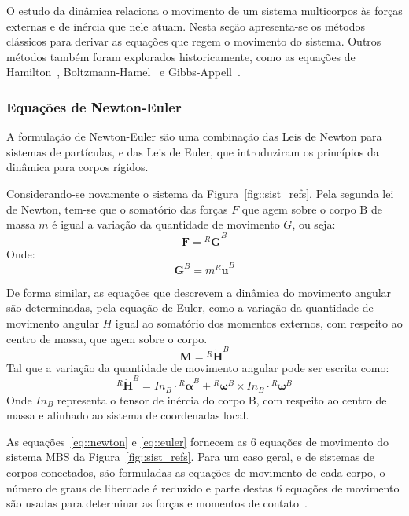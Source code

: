 O estudo da dinâmica relaciona o movimento de um sistema multicorpos às forças
externas e de inércia que nele atuam. Nesta seção apresenta-se os métodos
clássicos para derivar as equações que regem o movimento do sistema. Outros
métodos também foram explorados historicamente, como as equações de
Hamilton~\cite{shabana2013dynamics},
Boltzmann-Hamel~\cite{papastavridis1994boltzmann} e
Gibbs-Appell~\cite{gibbsappell}.
 
\subsubsection{Equações de Newton-Euler}

A formulação de Newton-Euler são uma combinação das Leis de Newton para sistemas
de partículas, e das Leis de Euler, que introduziram os princípios da dinâmica
para corpos rígidos. 

Considerando-se novamente o sistema da Figura~\ref{fig::sist_refs}. Pela segunda
lei de Newton, tem-se que o somatório das forças $F$ que agem sobre o corpo B de
massa $m$ é igual a variação da quantidade de movimento $G$, ou seja:
%
\begin{equation} \label{eq::newton}
	\mathbf{F} = {^R}{\dot{\mathbf{G}}}^{B}
\end{equation}
%
Onde:
%
\begin{equation}
	\mathbf{G}^{B} = m {^R}\dot{\textbf{u}}^{B}
\end{equation}
%


De forma similar, as equações que descrevem a dinâmica do movimento angular são
determinadas, pela equação de Euler, como a variação da quantidade de movimento
angular $H$ igual ao somatório dos momentos externos, com respeito
ao centro de massa, que agem sobre o corpo.
%
\begin{equation} \label{eq::euler}
	\mathbf{M} = {^R}{\dot{\mathbf{H}}}^{B}
\end{equation}
%
Tal que a variação da quantidade de movimento angular pode ser escrita como:
%
\begin{equation}
	{^R}{\dot{\mathbf{H}}}^{B} = In_B \cdot {^R}\dot{\boldsymbol{\alpha}}^{B} +
	{^R}\boldsymbol{\omega}^{B} \times In_B \cdot {^R}\boldsymbol{\omega}^{B}
\end{equation}
%
Onde $In_B$ representa o tensor de inércia do corpo B, com respeito ao centro de
massa e alinhado ao sistema de coordenadas local.

As equações~\ref{eq::newton} e \ref{eq::euler} fornecem as 6 equações de
movimento do sistema MBS da Figura~\ref{fig::sist_refs}. Para um caso geral, e
de sistemas de corpos conectados, são formuladas as equações de movimento de
cada corpo, o número de graus de liberdade é reduzido e parte destas 6 equações
de movimento são usadas para determinar as forças e momentos de
contato~\cite{tenenbaum2006fundamentals}.


